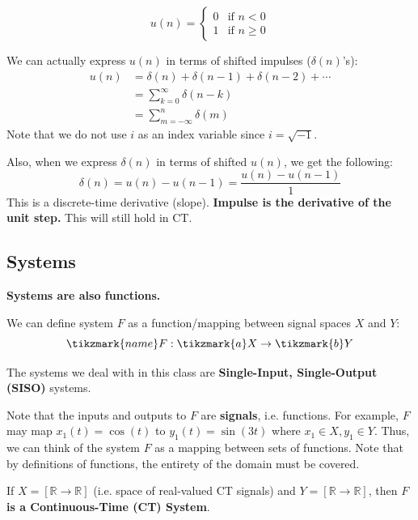 \[
    u(n)= \begin{cases}
    0 & \text{if } n < 0 \\
    1 & \text{if } n \geq 0
    \end{cases}
\]

We can actually express $u(n)$ in terms of shifted impulses ($\delta(n)$'s):
\begin{align*}
    u(n) &= \delta(n) + \delta(n-1) + \delta(n-2) + \cdots \\
    &= \sum_{k=0}^{\infty} \delta(n-k) \\
    &= \sum_{m = -\infty}^n \delta(m)
\end{align*}
Note that we do not use $i$ as an index variable since $i=\sqrt{-1}$.

Also, when we express $\delta(n)$ in terms of shifted $u(n)$, we get the following:
\[\delta(n)=u(n) - u(n-1)=\frac{u(n) - u(n-1)}{1}\]
This is a discrete-time derivative (slope).\textbf{ Impulse is the derivative of the unit step.} This will still hold in CT.

\subsection{Systems}

\textbf{Systems are also functions.
}

We can define system $F$ as a function/mapping between signal spaces $X$ and $Y$: \\
\[
\tikzmark{name}F: \tikzmark{a}X \to \tikzmark{b}Y
\] 

The systems we deal with in this class are \textbf{Single-Input, Single-Output (SISO)} systems.

Note that the inputs and outputs to $F$ are \textbf{signals}, i.e. functions. For example, $F$ may map $x_1(t) = \cos(t)$ to $y_1(t) = \sin(3t)$ where $x_1 \in X, y_1 \in Y$. Thus, we can think of the system $F$ as a mapping between sets of functions. Note that by definitions of functions, the entirety of the domain must be covered.

If $X = [\mathbb{R} \rightarrow \mathbb{R}]$ (i.e. space of real-valued CT signals) and $Y = [\mathbb{R} \rightarrow \mathbb{R}]$, then \textbf{$F$ is a Continuous-Time (CT) System}.

